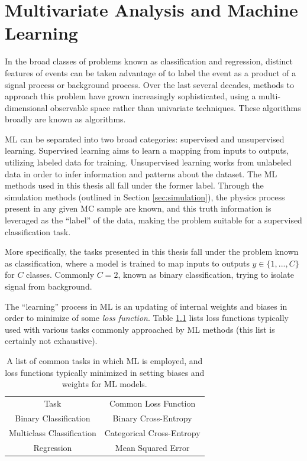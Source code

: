 
\chapter{Multivariate Analysis and Machine Learning} \label{app:MVA}

In the broad classes of problems known as classification and regression, distinct features of events can be taken advantage of to label the event as a product of a signal process or background process. Over the last several decades, methods to approach this problem have grown increasingly sophisticated, using a multi-dimensional observable space rather than univariate techniques. These algorithms broadly are known as  algorithms.


\gls{ML} can be separated into two broad categories: supervised and unsupervised learning. Supervised learning aims to learn a mapping from inputs to outputs, utilizing labeled data for training. Unsupervised learning works from unlabeled data in order to infer information and patterns about the dataset. The \gls{ML} methods used in this thesis all fall under the former label. Through the simulation methods (outlined in Section \ref{sec:simulation}), the physics process present in any given \gls{MC} sample are known, and this truth information is leveraged as the ``label'' of the data, making the problem suitable for a supervised classification task.

More specifically, the tasks presented in this thesis fall under the problem known as classification, where a model is trained to map inputs to outputs $y \in \{1,...,C\}$ for $C$ classes. Commonly $C=2$, known as binary classification, trying to isolate signal from background.  

The ``learning'' process in \gls{ML} is an updating of internal weights and biases in order to minimize of some \textit{loss function}. Table \ref{tab:loss-functions} lists loss functions typically used with various tasks commonly approached by \gls{ML} methods (this list is certainly not exhaustive).

\begin{table}[!ht]
    \centering
    \begin{tabular}{c|c}
        Task                  & Common Loss Function \\
        \cline{1-2}
        Binary Classification     & Binary Cross-Entropy\\
        Multiclass Classification & Categorical Cross-Entropy\\
        Regression                & Mean Squared Error
    \end{tabular}  
    \caption[A list of common tasks in which \gls{ML} is employed, and loss functions typically used.]{A list of common tasks in which \gls{ML} is employed, and loss functions typically minimized in setting biases and weights for \gls{ML} models.}
    \label{tab:loss-functions}
\end{table}


